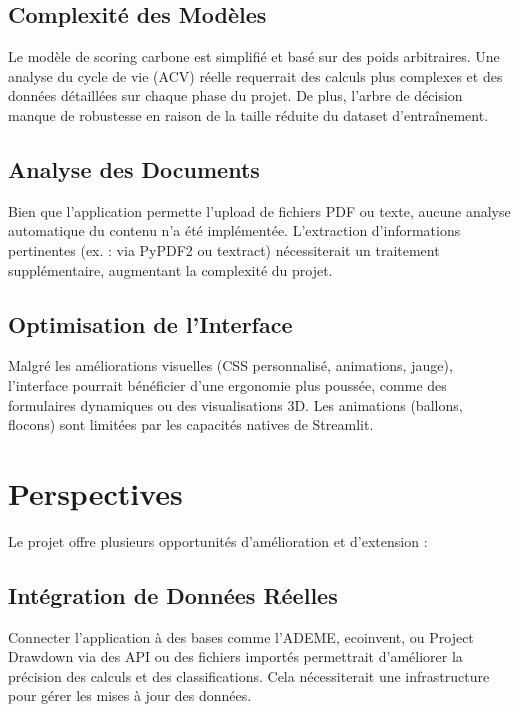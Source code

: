 \documentclass[a4paper,12pt]{article}
\begin{document}
\subsection{Complexité des Modèles}
Le modèle de scoring carbone est simplifié et basé sur des poids arbitraires. Une analyse du cycle de vie (ACV) réelle requerrait des calculs plus complexes et des données détaillées sur chaque phase du projet. De plus, l'arbre de décision manque de robustesse en raison de la taille réduite du dataset d'entraînement.

\subsection{Analyse des Documents}
Bien que l'application permette l'upload de fichiers PDF ou texte, aucune analyse automatique du contenu n'a été implémentée. L'extraction d'informations pertinentes (ex. : via PyPDF2 ou textract) nécessiterait un traitement supplémentaire, augmentant la complexité du projet.

\subsection{Optimisation de l'Interface}
Malgré les améliorations visuelles (CSS personnalisé, animations, jauge), l'interface pourrait bénéficier d'une ergonomie plus poussée, comme des formulaires dynamiques ou des visualisations 3D. Les animations (ballons, flocons) sont limitées par les capacités natives de Streamlit.

\section{Perspectives}
Le projet offre plusieurs opportunités d'amélioration et d'extension :

\subsection{Intégration de Données Réelles}
Connecter l'application à des bases comme l'ADEME, ecoinvent, ou Project Drawdown via des API ou des fichiers importés permettrait d'améliorer la précision des calculs et des classifications. Cela nécessiterait une infrastructure pour gérer les mises à jour des données.

\end{document}
